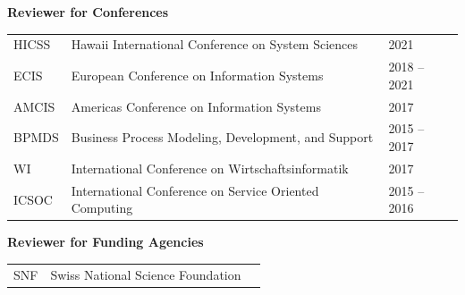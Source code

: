 \smallskip 
\textbf{Reviewer for Conferences}
\smallskip	

\begin{tabular}{p{1.7cm}p{11.3cm}l}
	
HICSS &	Hawaii International Conference on System Sciences &  \hphantom{2018 -- }2021 \\
	ECIS &	European Conference on Information Systems&  2018 -- 2021 \\
	AMCIS & 	Americas Conference on Information Systems &  \hphantom{2018 -- }2017 \\
		BPMDS & Business Process Modeling, Development, and Support &  2015 --  2017 \\
		WI & International Conference on Wirtschaftsinformatik & \hphantom{2018 -- }2017 \\
		ICSOC & International Conference on Service Oriented Computing &  2015 -- 2016 \\
\end{tabular}

\smallskip
\textbf{Reviewer for Funding Agencies}
\smallskip

\begin{tabular}{p{1.7cm}p{11.3cm}l}
SNF & Swiss National Science Foundation \\
\end{tabular}


